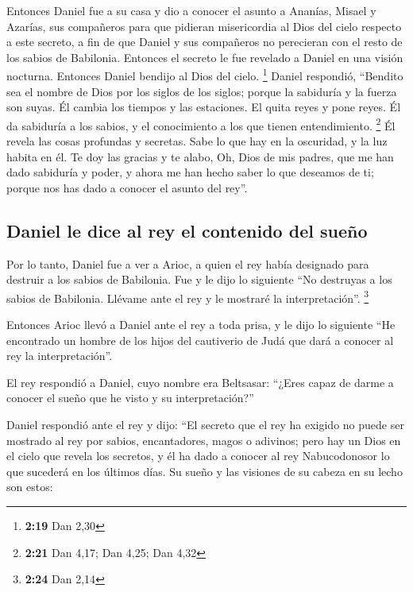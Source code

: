 \begin{paracol}{2}
 Entonces Daniel fue a su casa y dio a conocer el asunto
a Ananías, Misael y Azarías, sus compañeros  para que
pidieran misericordia al Dios del cielo respecto a este secreto, a fin
de que Daniel y sus compañeros no perecieran con el resto de los sabios
de Babilonia.  Entonces el secreto le fue revelado a
Daniel en una visión nocturna. Entonces Daniel bendijo al Dios del
cielo. \footnote{\textbf{2:19} Dan 2,30}  Daniel
respondió, ``Bendito sea el nombre de Dios por los siglos de los siglos;
porque la sabiduría y la fuerza son suyas.  Él cambia los
tiempos y las estaciones. El quita reyes y pone reyes. Él da sabiduría a
los sabios, y el conocimiento a los que tienen entendimiento.
\footnote{\textbf{2:21} Dan 4,17; Dan 4,25; Dan 4,32}  Él
revela las cosas profundas y secretas. Sabe lo que hay en la oscuridad,
y la luz habita en él.  Te doy las gracias y te alabo,
Oh, Dios de mis padres, que me han dado sabiduría y poder, y ahora me
han hecho saber lo que deseamos de ti; porque nos has dado a conocer el
asunto del rey''.

\hypertarget{daniel-le-dice-al-rey-el-contenido-del-sueuxf1o}{%
\subsection{Daniel le dice al rey el contenido del
sueño}\label{daniel-le-dice-al-rey-el-contenido-del-sueuxf1o}}

 Por lo tanto, Daniel fue a ver a Arioc, a quien el rey
había designado para destruir a los sabios de Babilonia. Fue y le dijo
lo siguiente ``No destruyas a los sabios de Babilonia. Llévame ante el
rey y le mostraré la interpretación''. \footnote{\textbf{2:24} Dan 2,14}

 Entonces Arioc llevó a Daniel ante el rey a toda prisa,
y le dijo lo siguiente ``He encontrado un hombre de los hijos del
cautiverio de Judá que dará a conocer al rey la interpretación''.

 El rey respondió a Daniel, cuyo nombre era Beltsasar:
``¿Eres capaz de darme a conocer el sueño que he visto y su
interpretación?''

 Daniel respondió ante el rey y dijo: ``El secreto que el
rey ha exigido no puede ser mostrado al rey por sabios, encantadores,
magos o adivinos;  pero hay un Dios en el cielo que
revela los secretos, y él ha dado a conocer al rey Nabucodonosor lo que
sucederá en los últimos días. Su sueño y las visiones de su cabeza en su
lecho son estos:


\end{paracol}
